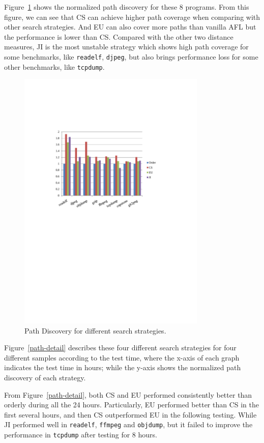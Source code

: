 Figure~\ref{path-discovery} shows the normalized path discovery for these 8 programs. From this figure, we can see that CS can achieve higher path coverage when comparing with other search strategies. And EU can also cover more paths than vanilla AFL but the performance is lower than CS. Compared with the other two distance measures, JI is the most unstable strategy which shows high path coverage for some benchmarks, like \texttt{readelf}, \texttt{djpeg}, but also brings performance loss for some other benchmarks, like \texttt{tcpdump}. 
\begin{figure}
\centering
\includegraphics[width=0.8\textwidth]{figures/path-discovery.pdf} 
\caption{Path Discovery for different search strategies.}\label{path-discovery}
\end{figure}
Figure~\ref{path-detail} describes these four different search strategies for four different samples according to the test time, where the x-axis of each graph indicates the test time in hours; while the y-axis shows the normalized path discovery of each strategy.

From Figure~\ref{path-detail}, both CS and EU performed consistently better than orderly during all the 24 hours. Particularly, EU performed better than CS in the first several hours, and then CS outperformed EU in the following testing. While JI performed well in \texttt{readelf}, \texttt{ffmpeg} and \texttt{objdump}, but it failed to improve the performance in \texttt{tcpdump} after testing for 8 hours.

